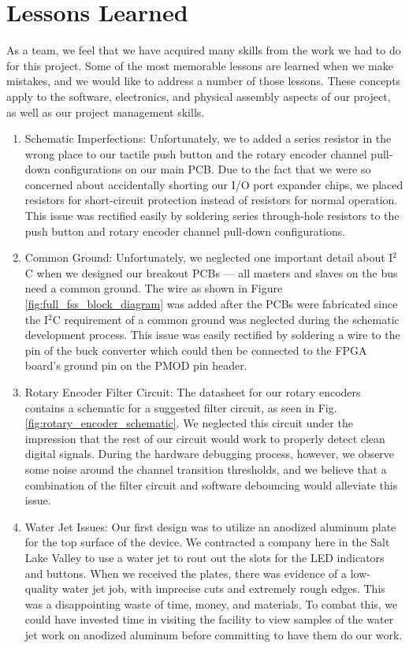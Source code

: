 \documentclass[conference]{IEEEtran}
\begin{document}
\section{Lessons Learned}
As a team, we feel that we have acquired many skills from the work we had to do for this project. Some of the most memorable lessons are learned when we make mistakes, and we would like to address a number of those lessons. These concepts apply to the software, electronics, and physical assembly aspects of our project, as well as our project management skills.

\begin{enumerate}
  \item Schematic Imperfections: Unfortunately, we to added a series resistor in the wrong place to our tactile push button and the rotary encoder channel pull-down configurations on our main PCB. Due to the fact that we were so concerned about accidentally shorting our I/O port expander chips, we placed resistors for short-circuit protection instead of resistors for normal operation. This issue was rectified easily by soldering series through-hole resistors to the push button and rotary encoder channel pull-down configurations.
  \item Common Ground: Unfortunately, we neglected one important detail about I$^2$C when we designed our breakout PCBs --- all masters and slaves on the bus need a common ground. The  wire as shown in Figure \ref{fig:full_fss_block_diagram} was added after the PCBs were fabricated since the I$^2$C requirement of a common ground was neglected during the schematic development process. This issue was easily rectified by soldering a wire to the  pin of the buck converter which could then be connected to the FPGA board's ground pin on the PMOD pin header.
  \item Rotary Encoder Filter Circuit: The datasheet for our rotary encoders contains a schematic for a suggested filter circuit, as seen in Fig. \ref{fig:rotary_encoder_schematic}. We neglected this circuit under the impression that the rest of our circuit would work to properly detect clean digital signals. During the hardware debugging process, however, we observe some noise around the channel transition thresholds, and we believe that a combination of the filter circuit and software debouncing would alleviate this issue.
  \item Water Jet Issues: Our first design was to utilize an anodized aluminum plate for the top surface of the device. We contracted a company here in the Salt Lake Valley to use a water jet to rout out the slots for the LED indicators and buttons. When we received the plates, there was evidence of a low-quality water jet job, with imprecise cuts and extremely rough edges. This was a disappointing waste of time, money, and materials. To combat this, we could have invested time in visiting the facility to view samples of the water jet work on anodized aluminum before committing to have them do our work.

\end{enumerate}
\end{document}
